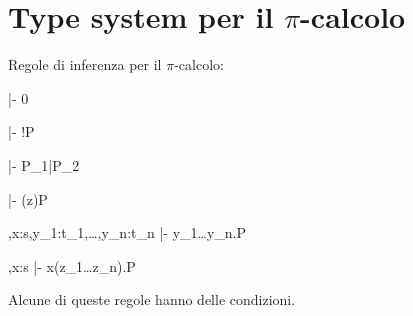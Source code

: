 \section{Type system per il \texorpdfstring{$\pi$}{pi}-calcolo}

Regole di inferenza per il $\pi$-calcolo:

\begin{pilisting}
\inference[nil]
  {}
  {\Psi |- 0}

\vspace{3 mm}
\indent\indent
{}
  {\Psi |- !P}

\vspace{3 mm}
\indent\indent
{}
  {\Psi |- P_1|P_2}

\vspace{3 mm}
\indent\indent
{}
  {\Psi |- (z)P}

\vspace{3 mm}
\indent\indent
{}
  {\Psi,x:s,y_1:t_1,\ldots,y_n:t_n |- \langle y_1\ldots y_n\rangle.P}

\vspace{3 mm}
\indent\indent
{}
  {\Psi,x:s |- x(z_1\ldots z_n).P}
\end{pilisting}

Alcune di queste regole hanno delle condizioni.
